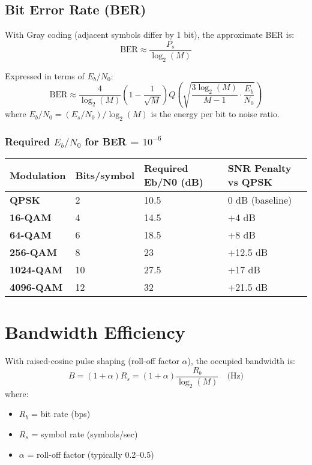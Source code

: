 \subsection{Bit Error Rate (BER)}

With Gray coding (adjacent symbols differ by 1 bit), the approximate BER is:
\begin{equation}
\text{BER} \approx \frac{P_s}{\log_2(M)}
\label{eq:qam-ber-gray}
\end{equation}

Expressed in terms of $E_b/N_0$:
\begin{equation}
\text{BER} \approx \frac{4}{\log_2(M)}\left(1 - \frac{1}{\sqrt{M}}\right) Q\left(\sqrt{\frac{3\log_2(M)}{M-1} \cdot \frac{E_b}{N_0}}\right)
\label{eq:qam-ber-eb}
\end{equation}
where $E_b/N_0 = (E_s/N_0) / \log_2(M)$ is the energy per bit to noise ratio.

\subsubsection{Required $E_b/N_0$ for BER = $10^{-6}$}

{\def\LTcaptype{} %
\begin{longtable}[]{@{}llll@{}}
\toprule\noalign{}
Modulation & Bits/symbol & Required Eb/N0 (dB) & SNR Penalty vs QPSK \\
\midrule\noalign{}
\endhead
\bottomrule\noalign{}
\endlastfoot
\textbf{QPSK} & 2 & 10.5 & 0 dB (baseline) \\
\textbf{16-QAM} & 4 & 14.5 & +4 dB \\
\textbf{64-QAM} & 6 & 18.5 & +8 dB \\
\textbf{256-QAM} & 8 & 23 & +12.5 dB \\
\textbf{1024-QAM} & 10 & 27.5 & +17 dB \\
\textbf{4096-QAM} & 12 & 32 & +21.5 dB \\
\end{longtable}
}

\section{Bandwidth Efficiency}

With raised-cosine pulse shaping (roll-off factor $\alpha$), the occupied bandwidth is:
\begin{equation}
B = (1 + \alpha) R_s = (1 + \alpha) \frac{R_b}{\log_2(M)} \quad \text{(Hz)}
\label{eq:qam-bandwidth}
\end{equation}
where:
\begin{itemize}
\item $R_b$ = bit rate (bps)
\item $R_s$ = symbol rate (symbols/sec)
\item $\alpha$ = roll-off factor (typically 0.2--0.5)
\end{itemize}

